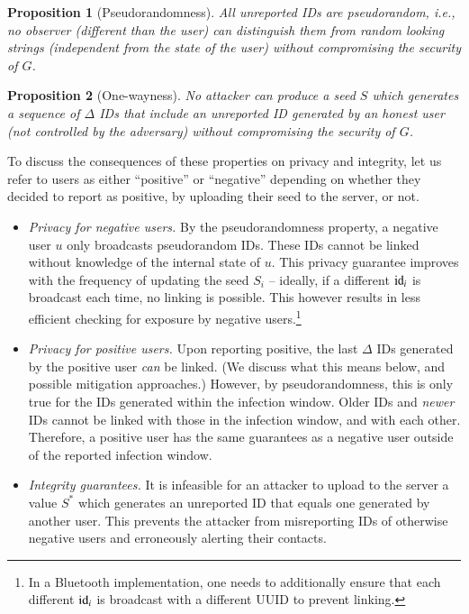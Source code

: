 \documentclass{article}
\newtheorem{proposition}{Proposition}
\begin{document}
\begin{proposition}[Pseudorandomness]
   All unreported IDs are pseudorandom, i.e., no observer (different than the user) can distinguish them from random looking strings (independent from the state of the user) without compromising the security of $G$.
\end{proposition}

\begin{proposition}[One-wayness]
   No attacker can produce a seed $S$ which generates a sequence of $\Delta$ IDs that include an unreported ID generated by an honest user (not controlled by the adversary) without compromising the security of $G$.
\end{proposition}

To discuss the consequences of these properties on privacy and integrity, let us refer to users as either ``positive'' or ``negative'' depending on whether they decided to report as positive, by uploading their seed to the server, or not. 
\begin{itemize}
    \item {\em Privacy for negative users.}  By the pseudorandomness property, a negative user $u$ only broadcasts pseudorandom IDs. These IDs cannot be linked without knowledge of the internal state of $u$. This privacy guarantee improves with the frequency of updating the seed $S_i$ -- ideally, if a different $\mathrm{id}_i$ is broadcast each time, no linking is possible. This however results in less efficient checking for exposure by negative users.\footnote{In a Bluetooth implementation, one needs to additionally ensure that each different $\mathrm{id}_i$ is broadcast with a different UUID to prevent linking.}
    \item {\em Privacy for positive users.} Upon reporting positive, the last $\Delta$ IDs generated by the positive user {\em can} be linked. (We discuss what this means below, and possible mitigation approaches.) However, by pseudorandomness, this is only true for the IDs generated within the infection window. Older IDs and {\em newer} IDs cannot be linked with those in the infection window, and with each other. Therefore, a positive user has the same guarantees as a negative user outside of the reported infection window.
    \item {\em Integrity guarantees.} It is infeasible for an attacker to upload to the server a value $S^*$ which generates an unreported ID that equals one generated by another user. This prevents the attacker from misreporting IDs of otherwise negative users and erroneously alerting their contacts.  
\end{itemize}
\end{document}
